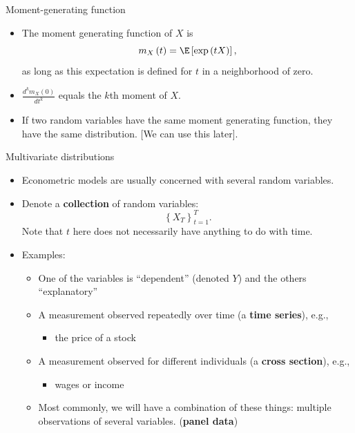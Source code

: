 \documentclass[aspectratio=169,11pt]{beamer}
\begin{document}
\begin{frame}{Moment-generating function}
\begin{itemize}
	\item The moment generating function of $X$ is \[
		m_X \left(t\right) = \E\left[\exp\left(tX\right)\right],
	\]	
	as long as this expectation is defined for $t$ in a neighborhood of zero. 
	
	\medskip 
	\item $\frac{d^k m_X \left(0\right) }{dt^k}$ equals the $k$th moment of $X$.

	\medskip
	\item If two random variables have the same moment generating function, they have the same distribution. [We can use this later].
\end{itemize}
\end{frame}



\begin{frame}{Multivariate distributions}
\begin{itemize}
	\item Econometric models are usually concerned with several random variables.

	\item Denote a {\bf collection} of random variables:\[
		\left\{ X_T\right\}_{t=1}^{T}.
	\]
	Note that $t$ here does not necessarily have anything to do with time.

	\item Examples:
	\begin{itemize}
		\item One of the variables  is ``dependent'' (denoted $Y$) and the others ``explanatory''

		\item A measurement observed repeatedly over time (a {\bf time series}), e.g.,
		\begin{itemize}
			\item the price of a stock
		\end{itemize}

		\item A measurement observed for different individuals (a {\bf cross section}), e.g.,
		\begin{itemize}
			\item wages or income
		\end{itemize}
		\item Most commonly, we will have a combination of these things: multiple observations of several variables. ({\bf panel data})
	\end{itemize}
\end{itemize}
\end{frame}
\end{document}
